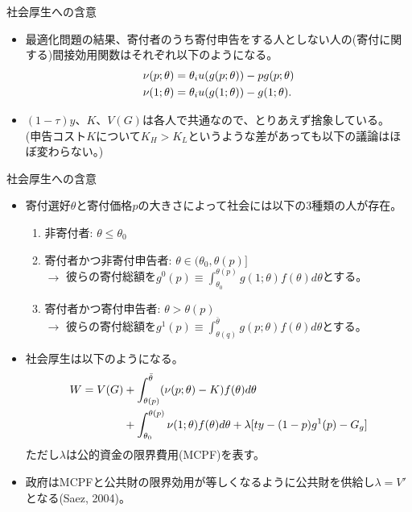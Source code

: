\documentclass[dvipdfmx,10pt]{beamer}
\begin{document}
\begin{frame}{社会厚生への含意}
	\begin{itemize}
	\item 最適化問題の結果、寄付者のうち寄付申告をする人としない人の(寄付に関する)間接効用関数はそれぞれ以下のようになる。
	\begin{align}
		\nu(p;\theta)&=\theta_i u(g(p;\theta))-pg(p;\theta)\notag\\
		\nu(1;\theta)&=\theta_i u(g(1;\theta))-g(1;\theta)\notag.
	\end{align}
	\item $(1-\tau)y$、$K$、$V(G)$は各人で共通なので、とりあえず捨象している。\\
	(申告コスト$K$について$K_H>K_L$というような差があっても以下の議論はほぼ変わらない。)
\end{itemize}
\end{frame}

\begin{frame}{社会厚生への含意}
	\begin{itemize}
		\item 寄付選好$\theta$と寄付価格$p$の大きさによって社会には以下の3種類の人が存在。
		\begin{enumerate}
			\item 非寄付者: $\theta\le \theta_0$
			\item 寄付者かつ非寄付申告者: $\theta\in(\theta_0,\theta(p)]$\\
			$\to$ 彼らの寄付総額を$g^0(p)\equiv\int_{\theta_0}^{\theta(p)}g(1;\theta)f(\theta)d\theta$とする。
			\item 寄付者かつ寄付申告者: $\theta>\theta(p)$\\
			$\to$ 彼らの寄付総額を$g^1(p)\equiv\int_{\theta(q)}^{\bar{\theta}}g(p;\theta)f(\theta)d\theta$とする。
		\end{enumerate}
	\item 社会厚生は以下のようになる。
	\begin{align}
		W=V(G)&+\int_{\theta(p)}^{\bar{\theta}}(\nu(p;\theta)-K)f(\theta)d\theta\notag\\
		&+\int_{\theta_0}^{\theta(p)}\nu(1;\theta)f(\theta)d\theta+\lambda[ty-(1-p)g^1(p)-G_g]\notag
	\end{align}
	ただし$\lambda$は公的資金の限界費用(MCPF)を表す。
	\item 政府はMCPFと公共財の限界効用が等しくなるように公共財を供給し$\lambda=V'$となる(Saez, 2004)。
	\end{itemize}
\end{frame}
\end{document}
